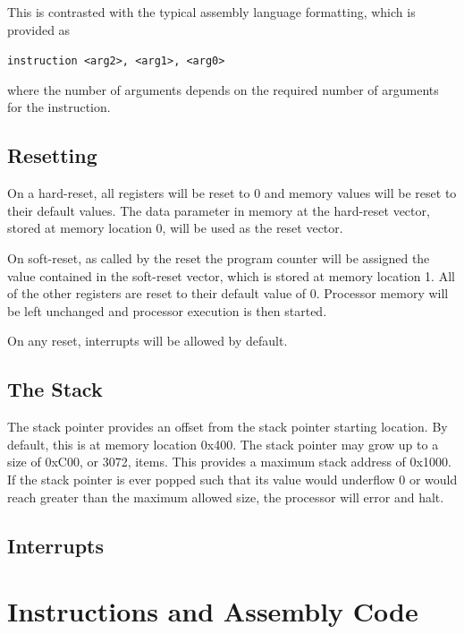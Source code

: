 \documentclass{article}
\begin{document}
This is contrasted with the typical assembly language formatting, which is provided as

\begin{center}
	\texttt{instruction <arg2>, <arg1>, <arg0>}
\end{center}

where the number of arguments depends on the required number of arguments for the instruction.

\subsection{Resetting}

On a hard-reset, all registers will be reset to 0 and memory values will be reset to their default values. The data parameter in memory at the hard-reset vector, stored at memory location 0, will be used as the reset vector.

On soft-reset, as called by the reset the program counter will be assigned the value contained in the soft-reset vector, which is stored at memory location 1. All of the other registers are reset to their default value of 0. Processor memory will be left unchanged and processor execution is then started.

On any reset, interrupts will be allowed by default.

\subsection{The Stack}

The stack pointer provides an offset from the stack pointer starting location. By default, this is at memory location 0x400. The stack pointer may grow up to a size of 0xC00, or 3072, items. This provides a maximum stack address of 0x1000. If the stack pointer is ever popped such that its value would underflow 0 or would reach greater than the maximum allowed size, the processor will error and halt.

\subsection{Interrupts}


\pagebreak

\section{Instructions and Assembly Code}
\end{document}
